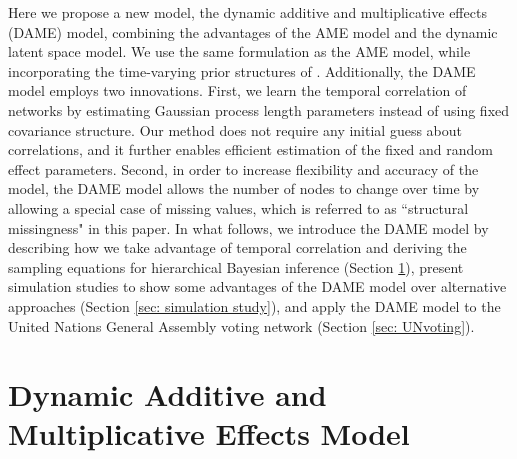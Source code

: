 \documentclass[a4paper]{article}
\begin{document}
		Here we propose a new model, the dynamic additive and multiplicative effects (DAME) model, combining the advantages of the AME model and the dynamic latent space model. We use the same formulation as the AME model, while incorporating the time-varying prior structures of \cite{durante2013nonparametric,durante2014bayesian2,durante2014bayesian}. Additionally, the DAME model employs two innovations. First, we learn the temporal correlation of networks by estimating Gaussian process length parameters instead of using fixed covariance structure. Our method does not require any initial guess about correlations, and it further enables efficient estimation of the fixed and random effect parameters. Second, in order to increase flexibility and accuracy of the model, the DAME model allows the number of nodes to change over time by allowing a special case of missing values, which is referred to as ``structural missingness" in this paper. In what follows, we introduce the DAME model by describing how we take advantage of temporal correlation and deriving the sampling equations for hierarchical Bayesian inference (Section \ref{sec: DAME}), present simulation studies to show some advantages of the DAME model over alternative approaches (Section \ref{sec: simulation study}), and apply the DAME model to the United Nations General Assembly voting network (Section \ref{sec: UNvoting}).
		
		\section{Dynamic Additive and Multiplicative Effects Model}\label{sec: DAME}
\end{document}
